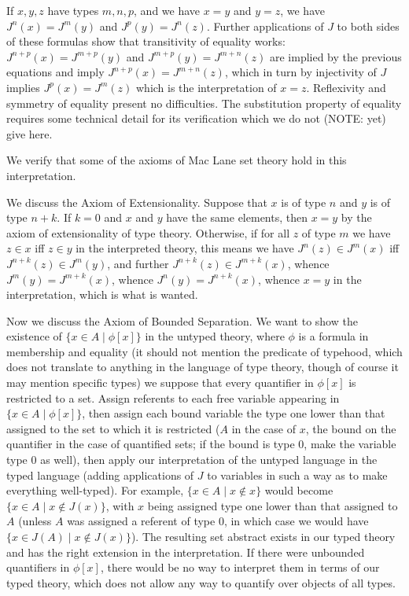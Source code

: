 \documentclass[12pt]{book}
\begin{document}
If $x,y,z$ have types $m,n,p$, and we have $x=y$ and $y=z$, we have
$J^n(x)=J^m(y)$ and $J^p(y)=J^n(z)$.  Further applications of $J$ to
both sides of these formulas show that transitivity of equality works:
$J^{n+p}(x)=J^{m+p}(y)$ and $J^{m+p}(y)=J^{m+n}(z)$ are implied by the
previous equations and imply $J^{n+p}(x)=J^{m+n}(z)$, which in turn by
injectivity of $J$ implies $J^p(x)=J^m(z)$ which is the interpretation
of $x=z$.  Reflexivity and symmetry of equality present no
difficulties.  The substitution property of equality requires some
technical detail for its verification which we do not (NOTE: yet) give
here.

We verify that some of the axioms of Mac Lane set theory hold in this
interpretation.

We discuss the Axiom of Extensionality.  Suppose that $x$ is of
type $n$ and $y$ is of type $n+k$.  If $k=0$ and $x$ and $y$ have the
same elements, then $x=y$ by the axiom of extensionality of type
theory.  Otherwise, if for all $z$ of type $m$ we have $z\in x$ iff $z
\in y$ in the interpreted theory, this means we have $J^n(z) \in
J^m(x)$ iff $J^{n+k}(z) \in J^m(y)$, and further $J^{n+k}(z) \in
J^{m+k}(x)$, whence $J^m(y) = J^{m+k}(x)$, whence $J^n(y) =
J^{n+k}(x)$, whence $x=y$ in the interpretation, which is what is
wanted.

Now we discuss the Axiom of Bounded Separation.  We want to show the
existence of $\{x \in A \mid \phi[x]\}$ in the untyped theory, where
$\phi$ is a formula in membership and equality (it should not mention
the predicate of typehood, which does not translate to anything in the
language of type theory, though of course it may mention specific
types) we suppose that every quantifier in $\phi[x]$ is restricted to
a set.  Assign referents to each free variable appearing in $\{x \in A
\mid \phi[x]\}$, then assign each bound variable the type one lower
than that assigned to the set to which it is restricted ($A$ in the
case of $x$, the bound on the quantifier in the case of quantified
sets; if the bound is type 0, make the variable type 0 as well), then
apply our interpretation of the untyped language in the typed language
(adding applications of $J$ to variables in such a way as to make
everything well-typed).  For example, $\{x \in A \mid x \not\in x\}$
would become $\{x \in A \mid x \not\in J(x)\}$, with $x$ being
assigned type one lower than that assigned to $A$ (unless $A$ was
assigned a referent of type 0, in which case we would have $\{x \in
J(A) \mid x \not\in J(x)\}$).  The resulting set abstract exists in
our typed theory and has the right extension in the interpretation.
If there were unbounded quantifiers in $\phi[x]$, there would be no
way to interpret them in terms of our typed theory, which does not
allow any way to quantify over objects of all types.
\end{document}
